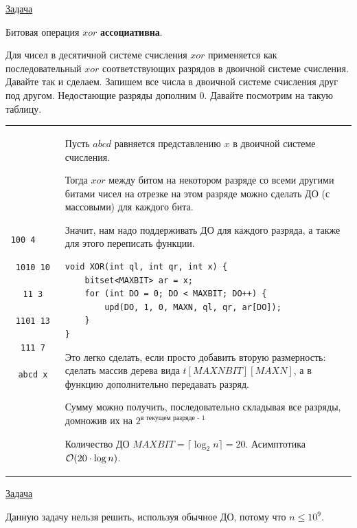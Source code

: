 \href{https://codeforces.com/problemset/problem/242/E}{Задача}

Битовая операция $xor$ {\bf ассоциативна}. 

Для чисел в десятичной системе счисления $xor$ применяется как последовательный $xor$ соответствующих разрядов в двоичной системе счисления. Давайте так и сделаем. Запишем все числа в двоичной системе счисления друг под другом. Недостающие разряды дополним $0$. Давайте посмотрим на такую таблицу. 

\down
\begin{tabular}{cm{}}
	\begin{minipage}{2.5cm}
		\begin{verbatim}
			 100 4    
			1010 10
			  11 3
			1101 13
			 111 7
			abcd x
		\end{verbatim}
	\end{minipage}  
	&
	Пусть $abcd$ равняется представлению $x$ в двоичной системе счисления.
	
	Тогда $xor$ между битом на некотором разряде со всеми другими битами чисел на отрезке на этом разряде можно сделать ДО (с массовыми) для каждого бита.
	
	Значит, нам надо поддерживать ДО для каждого разряда, а также для этого переписать функции.
	
	\up \up
	\begin{verbatim}
void XOR(int ql, int qr, int x) {
	bitset<MAXBIT> ar = x;
	for (int DO = 0; DO < MAXBIT; DO++) {
		upd(DO, 1, 0, MAXN, ql, qr, ar[DO]);
	}
}
	\end{verbatim}
	\up \up
	
	
	Это легко сделать, если просто добавить вторую размерность: сделать массив дерева вида $t[MAXNBIT][MAXN]$,  а в функцию дополнительно передавать разряд.
	
	Сумму можно получить, последовательно складывая все разряды, домножив их на $2^{\text{в текущем разряде - 1}}$
	
	Количество ДО $MAXBIT=\lceil\log_2 n\rceil = 20$. Асимптотика $\mathcal{O}(20 \cdot \log n)$.
\end{tabular}

\pagebreak


\href{https://codeforces.com/contest/915/problem/E}{Задача}
\href{https://codeforces.com/contest/915/submission/106223693}{}

Данную задачу нельзя решить, используя обычное ДО, потому что $n \le 10^9$.

